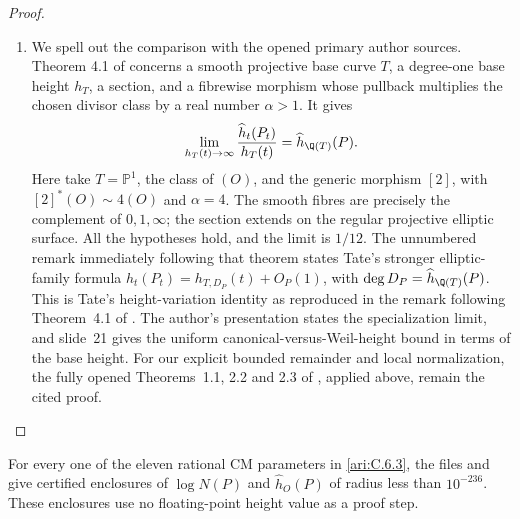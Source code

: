 \begin{proof}
\begin{enumerate}[label=\arabic*.,leftmargin=*]
\item We spell out the comparison with the opened primary author sources.
Theorem 4.1 of \citet[pp.~183--184]{callSilverman1993} concerns a
smooth projective base curve $T$, a degree-one base height $h_T$,
a section, and a fibrewise morphism whose pullback multiplies the
chosen divisor class by a real number $\alpha>1$. It gives
\[
 \lim_{h_T(t)\to\infty}
 \frac{\widehat h_t(P_t)}{h_T(t)}
       =\widehat h_{\Q(T)}(P).
\]
Here take $T=\mathbb P^1$, the class of $(O)$, and the generic
morphism $[2]$, with $[2]^*(O)\sim4(O)$ and $\alpha=4$.
The smooth fibres are precisely the complement of $0,1,\infty$;
the section extends on the regular projective elliptic surface.
All the hypotheses hold, and the limit is $1/12$.
The unnumbered remark immediately following that theorem states
Tate's stronger elliptic-family formula
$\widehat h_t(P_t)=h_{T,D_P}(t)+O_P(1)$, with
$\deg D_P=\widehat h_{\Q(T)}(P)$. This is Tate's height-variation identity as reproduced in the
remark following Theorem~4.1 of \citet[pp.~183--184]{callSilverman1993}.
The author's presentation \citet[slide~22]{silverman2006heights}
states the specialization limit, and slide~21 gives the uniform
canonical-versus-Weil-height bound in terms of the base height.
For our explicit bounded remainder and local normalization, the
fully opened Theorems~1.1, 2.2 and 2.3 of
\citet{demarco2017}, applied above, remain the cited proof.
\end{enumerate}
\end{proof}

\begin{proposition}\hypertarget{tag-000Z}{}\label{ari:C.6.5}

For every one of the eleven rational CM parameters in \ref{ari:C.6.3},
the files  and
 give certified enclosures of
$\log N(P)$ and $\widehat h_O(P)$ of radius less than
$10^{-236}$. These enclosures use no floating-point height
value as a proof step.
\end{proposition}


